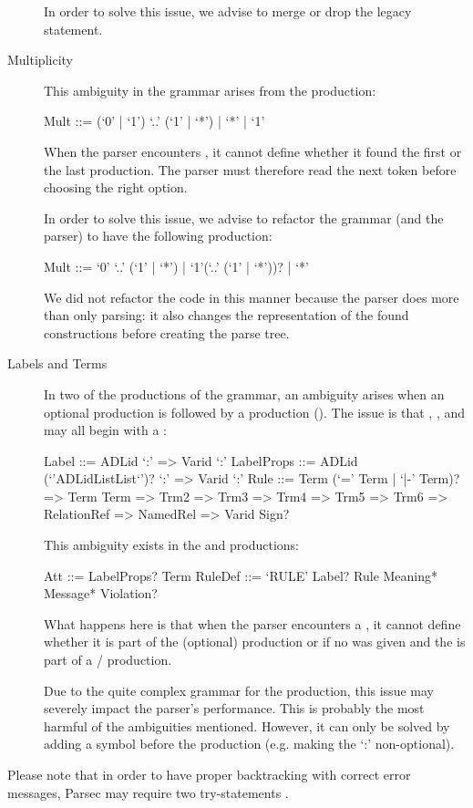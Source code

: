 \begin{description}
    In order to solve this issue, we advise to merge or drop the legacy statement.
    
  \item[Multiplicity]
    This ambiguity in the grammar arises from the  production:
    \begin{ebnf}
     Mult ::= (`0' | `1') `..' (`1' | `*') | `*' | `1'\end{ebnf}
    When the parser encounters , it cannot define whether it found the first or the last production.
    The parser must therefore read the next token before choosing the right option.
    
    In order to solve this issue, we advise to refactor the grammar (and the parser) to have the following production:
    \begin{ebnf}
     Mult ::= `0' `..' (`1' | `*') | `1'(`..' (`1' | `*'))? | `*'\end{ebnf}
    We did not refactor the code in this manner because the  parser does more than only parsing: it also changes the representation of the found constructions before creating the parse tree.
  
  \item[Labels and Terms]
    In two of the productions of the grammar, an ambiguity arises when an optional  production is followed by a  production ().
    The issue is that , ,  and  may all begin with a :
    \begin{ebnf}
     Label ::= ADLid `:' => Varid `:'
     LabelProps ::= ADLid (`{'ADLidListList`}')? `:' => Varid `:'
     Rule ::= Term (`=' Term | `|-' Term)? => Term
     Term => Trm2 => Trm3 => Trm4 => Trm5 => Trm6 => RelationRef => NamedRel => Varid Sign?\end{ebnf}
    This ambiguity exists in the  and  productions:
    \begin{ebnf}
     Att ::= LabelProps? Term
     RuleDef ::= `RULE' Label? Rule Meaning* Message* Violation?\end{ebnf}
    
    What happens here is that when the parser encounters a , it cannot define whether it is part of the (optional)  production or if no  was given and the  is part of a / production.
    
    Due to the quite complex grammar for the  production, this issue may severely impact the parser's performance.
    This is probably the most harmful of the ambiguities mentioned.
    However, it can only be solved by adding a symbol before the  production (e.g. making the `:' non-optional).
\end{description}
%
Please note that in order to have proper backtracking with correct error messages, Parsec may require two try-statements .

